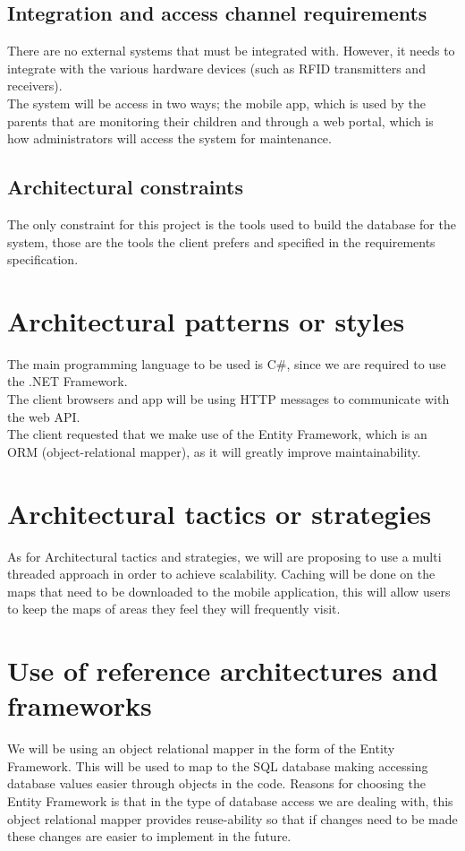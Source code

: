 \documentclass[11pt,titlepage]{article} %
\begin{document}
\subsection{Integration and access channel requirements}
There are no external systems that must be integrated with. However, it needs to integrate with the various hardware devices (such as RFID transmitters and receivers).\\
The system will be access in two ways; the mobile app, which is used by the parents that are monitoring their children and through a web portal, which is how administrators will access the system for maintenance.

\subsection{Architectural constraints}
The only constraint for this project is the tools used to build the database for the system, those are the tools the client prefers and specified in the requirements specification.

\section{Architectural patterns or styles}
The main programming language to be used is C\#, since we are required to use the .NET Framework.\\
The client browsers and app will be using HTTP messages to communicate with the web API.\\
The client requested that we make use of the Entity Framework, which is an ORM (object-relational mapper), as it will greatly improve maintainability.

\section{Architectural tactics or strategies}
As for Architectural tactics and strategies, we will are proposing to use a multi threaded approach in order to achieve scalability. Caching will be done on the maps that need to be downloaded to the mobile application, this will allow users to keep the maps of areas they feel they will frequently visit. 

\section{Use of reference architectures and frameworks}
We will be using an object relational mapper in the form of the Entity Framework. This will be used to map to the SQL database making accessing database values easier through objects in the code. Reasons for choosing the Entity Framework is that in the type of database access we are dealing with, this object relational mapper provides reuse-ability so that if changes need to be made these changes are easier to implement in the future. 
\end{document}
